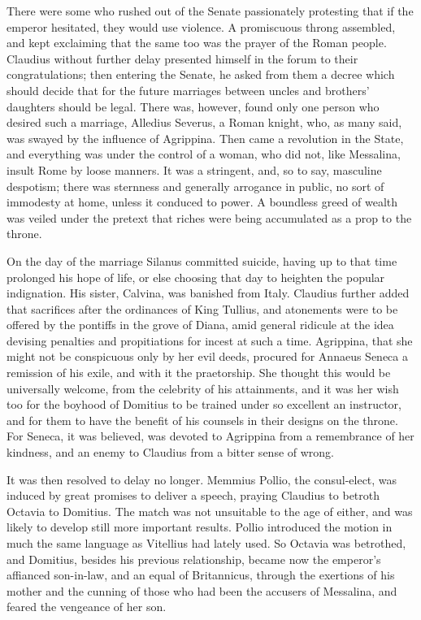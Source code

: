 
There were some who rushed out of the Senate passionately protesting that if the emperor hesitated, they would use violence. A promiscuous throng assembled, and kept exclaiming that the same too was the prayer of the Roman people. Claudius without further delay presented himself in the forum to their congratulations; then entering the Senate, he asked from them a decree which should decide that for the future marriages between uncles and brothers' daughters should be legal. There was, however, found only one person who desired such a marriage, Alledius Severus, a Roman knight, who, as many said, was swayed by the influence of Agrippina. Then came a revolution in the State, and everything was under the control of a woman, who did not, like Messalina, insult Rome by loose manners. It was a stringent, and, so to say, masculine despotism; there was sternness and generally arrogance in public, no sort of immodesty at home, unless it conduced to power. A boundless greed of wealth was veiled under the pretext that riches were being accumulated as a prop to the throne.


On the day of the marriage Silanus committed suicide, having up to that time prolonged his hope of life, or else choosing that day to heighten the popular indignation. His sister, Calvina, was banished from Italy. Claudius further added that sacrifices after the ordinances of King Tullius, and atonements were to be offered by the pontiffs in the grove of Diana, amid general ridicule at the idea devising penalties and propitiations for incest at such a time. Agrippina, that she might not be conspicuous only by her evil deeds, procured for Annaeus Seneca a remission of his exile, and with it the praetorship. She thought this would be universally welcome, from the celebrity of his attainments, and it was her wish too for the boyhood of Domitius to be trained under so excellent an instructor, and for them to have the benefit of his counsels in their designs on the throne. For Seneca, it was believed, was devoted to Agrippina from a remembrance of her kindness, and an enemy to Claudius from a bitter sense of wrong.


It was then resolved to delay no longer. Memmius Pollio, the consul-elect, was induced by great promises to deliver a speech, praying Claudius to betroth Octavia to Domitius. The match was not unsuitable to the age of either, and was likely to develop still more important results. Pollio introduced the motion in much the same language as Vitellius had lately used. So Octavia was betrothed, and Domitius, besides his previous relationship, became now the emperor's affianced son-in-law, and an equal of Britannicus, through the exertions of his mother and the cunning of those who had been the accusers of Messalina, and feared the vengeance of her son.

